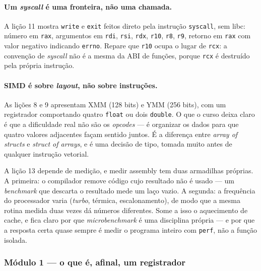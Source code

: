\paragraph{Um \emph{syscall} é uma fronteira, não uma chamada.} A lição 11
mostra \texttt{write} e \texttt{exit} feitos direto pela instrução
\texttt{syscall}, sem libc: número em \texttt{rax}, argumentos em \texttt{rdi},
\texttt{rsi}, \texttt{rdx}, \texttt{r10}, \texttt{r8}, \texttt{r9}, retorno em
\texttt{rax} com valor negativo indicando \texttt{errno}. Repare que
\texttt{r10} ocupa o lugar de \texttt{rcx}: a convenção de \emph{syscall} não é
a mesma da ABI de funções, porque \texttt{rcx} é destruído pela própria
instrução.

\paragraph{SIMD é sobre \emph{layout}, não sobre instruções.} As lições 8 e 9
apresentam XMM (128 bits) e YMM (256 bits), com um registrador comportando
quatro \texttt{float} ou dois \texttt{double}. O que o curso deixa claro é que a
dificuldade real não são os \emph{opcodes} --- é organizar os dados para que
quatro valores adjacentes façam sentido juntos. É a diferença entre \emph{array
of structs} e \emph{struct of arrays}, e é uma decisão de tipo, tomada muito
antes de qualquer instrução vetorial.

\begin{armadilha}
A lição 13 depende de medição, e medir assembly tem duas armadilhas próprias. A
primeira: o compilador remove código cujo resultado não é usado --- um
\emph{benchmark} que descarta o resultado mede um laço vazio. A segunda: a
frequência do processador varia (\emph{turbo}, térmica, escalonamento), de modo
que a mesma rotina medida duas vezes dá números diferentes. Some a isso o
aquecimento de cache, e fica claro por que \emph{microbenchmark} é uma
disciplina própria --- e por que a resposta certa quase sempre é medir o
programa inteiro com \texttt{perf}, não a função isolada.
\end{armadilha}

\subsubsection{Módulo 1 --- o que é, afinal, um registrador}

